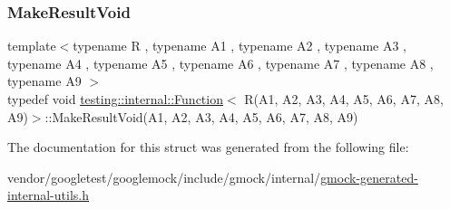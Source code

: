 \subsubsection{\texorpdfstring{Make\+Result\+Void}{MakeResultVoid}}
{\footnotesize\ttfamily template$<$typename R , typename A1 , typename A2 , typename A3 , typename A4 , typename A5 , typename A6 , typename A7 , typename A8 , typename A9 $>$ \\
typedef void \hyperlink{structtesting_1_1internal_1_1_function}{testing\+::internal\+::\+Function}$<$ R(A1, A2, A3, A4, A5, A6, A7, A8, A9)$>$\+::Make\+Result\+Void(A1, A2, A3, A4, A5, A6, A7, A8, A9)}



The documentation for this struct was generated from the following file\+:\begin{DoxyCompactItemize}
\item 
vendor/googletest/googlemock/include/gmock/internal/\hyperlink{gmock-generated-internal-utils_8h}{gmock-\/generated-\/internal-\/utils.\+h}\end{DoxyCompactItemize}
